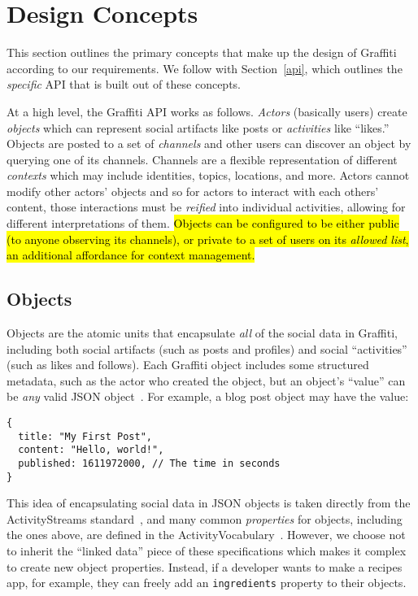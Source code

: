 \section{Design Concepts}
\label{concepts}

This section outlines the primary concepts that make up the design of Graffiti
according to our requirements.
We follow with Section~\ref{api}, which outlines the \emph{specific} API that is built out of these
concepts.

At a high level, the Graffiti API works as follows.
\emph{Actors} (basically users) create \emph{objects} which can represent
social artifacts like posts or \emph{activities} like ``likes.''
Objects are posted to a set of \emph{channels} and other users can
discover an object by querying one of its channels. Channels are a flexible representation
of different \emph{contexts} which may include identities, topics, locations,
and more.
Actors cannot modify other actors' objects and so for actors to interact with each others' content,
those interactions must be \emph{reified} into individual
activities,
allowing for different interpretations of them.
\hl{%
Objects can be configured to be either public
(to anyone observing its channels),
or private to a set of users on its \emph{allowed list},
an additional affordance for context management.
}%

\subsection{Objects}
\label{concepts:objects}

Objects are the atomic units that encapsulate \emph{all}
of the social data in Graffiti, including
both social artifacts (such as posts and profiles) and social ``activities'' (such as likes and follows).
Each Graffiti object includes some structured metadata,
such as the actor who created the object,
but an object's ``value'' can be \emph{any} valid JSON object~\cite{json}.
For example, a blog post object may have the value:

\begin{verbatim}
{
  title: "My First Post",
  content: "Hello, world!",
  published: 1611972000, // The time in seconds
}
\end{verbatim}

This idea of encapsulating social data in JSON objects is
taken directly from the ActivityStreams standard~\cite{activitystreams},
and many common \emph{properties} for objects,
including the ones above, are defined in the
ActivityVocabulary~\cite{activityvocab}.
However, we choose not to inherit the ``linked data'' piece
of these specifications which makes it complex to create new object properties.
Instead, if a developer wants to make a recipes app, for example,
they can freely add an \texttt{ingredients} property to their objects.

